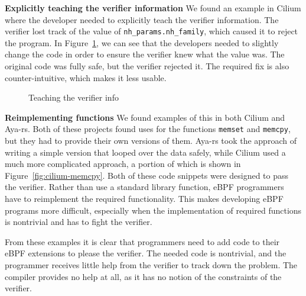 \noindent\textbf{Explicitly teaching the verifier information}
We found an example in Cilium where the developer needed to explicitly teach the verifier
    information.
The verifier lost track of the value of \texttt{nh\_params.nh\_family}, which caused it to reject the program.
In Figure~\ref{fig:teach-verifier}, we can see that the developers needed to slightly change the code in order to ensure the verifier knew what the value was.
The original code was fully safe, but the verifier rejected it.
The required fix is also counter-intuitive, which makes it less usable.

\begin{figure}
    
    \caption{Teaching the verifier info}
    \label{fig:teach-verifier}
\end{figure}

\noindent\textbf{Reimplementing functions}
We found examples of this in both Cilium and Aya-rs.
Both of these projects found uses for the functions \texttt{memset} and \texttt{memcpy}, but they had to provide their own versions of them.
Aya-rs took the approach of writing a simple version that looped over the data safely, while Cilium used a much more complicated approach, a portion of which is shown in Figure~\ref{fig:cilium-memcpy}.
Both of these code snippets were designed to pass the verifier.
Rather than use a standard library function, eBPF programmers have to reimplement the required functionality.
This makes developing eBPF programs more difficult, especially when the implementation of
    required functions is nontrivial and has to fight the verifier.

From these examples it is clear that programmers need to add code to their
    eBPF extensions to please the verifier.
The needed code is nontrivial, and the programmer receives little help from the verifier to track down
    the problem.
The compiler provides no help at all, as it has no notion of the constraints of the verifier.

